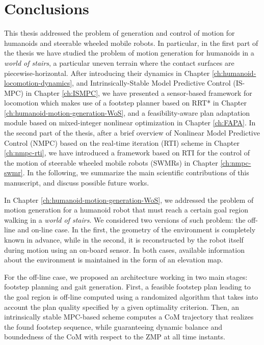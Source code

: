 \chapter{Conclusions}
\label{ch:conclusions}
This thesis addressed the problem of generation and control of motion for 
humanoids and steerable wheeled 
mobile robots. In particular, in the first part of the thesis
we have studied the problem of motion generation for humanoids 
in a \textit{world of stairs}, a particular uneven terrain where the contact 
surfaces are piecewise-horizontal. After introducing their dynamics in Chapter
\ref{ch:humanoid-locomotion-dynamics}, and Intrinsically-Stable Model Predictive
Control (IS-MPC) in Chapter \ref{ch:ISMPC},
we have presented a sensor-based framework for locomotion which makes use of a
footstep planner 
based on RRT* in Chapter \ref{ch:humanoid-motion-generation-WoS}, and a 
feasibility-aware plan adaptation module based on mixed-integer nonlinear
optimization in Chapter \ref{ch:FAPA}. In the second part of the thesis,
after a brief overview of Nonlinear Model Predictive Control (NMPC) based on the
real-time iteration (RTI) scheme in Chapter \ref{ch:nmpc-rti}, we have 
introduced a framework based on RTI for the control of the motion of steerable wheeled 
mobile robots (SWMRs) in Chapter \ref{ch:nmpc-swmr}. In the following, we
summarize the main scientific contributions of this manuscript, and discuss 
possible future works.

\medskip

In Chapter \ref{ch:humanoid-motion-generation-WoS},
we addressed the problem of motion generation for a humanoid
robot that must reach a certain goal region walking in a \textit{world of stairs}.
We considered two versions of such problem: the off-line and on-line case. 
In the first, the geometry of the environment is completely known in advance,
while in the second, it is reconstructed by the robot itself during motion using
an on-board sensor. In both cases, available information about the environment
is maintained in the form of an elevation map. 

For the off-line case, we proposed an architecture working in two main stages:
footstep planning and gait generation.
First, a feasible footstep plan leading to the goal region is off-line computed
using a randomized algorithm that takes into account the plan quality specified
by a given optimality criterion.
Then, an intrinsically stable MPC-based scheme computes a CoM trajectory that
realizes the found footstep sequence, while guaranteeing dynamic balance and
boundedness of the CoM with respect to the ZMP at all time instants.

